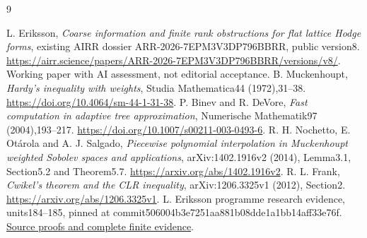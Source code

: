 \documentclass[11pt]{article}
\begin{document}
\begin{thebibliography}{9}\small\raggedright
{} L. Eriksson, \emph{Coarse information and finite rank
obstructions for flat lattice Hodge forms}, existing AIRR dossier
ARR-2026-7EPM3V3DP796BBRR, public version8.
\url{https://airr.science/papers/ARR-2026-7EPM3V3DP796BBRR/versions/v8/}.
Working paper with AI assessment, not editorial acceptance.
 B. Muckenhoupt, \emph{Hardy's inequality with weights},
Studia Mathematica44 (1972),31--38.
\url{https://doi.org/10.4064/sm-44-1-31-38}.
 P. Binev and R. DeVore, \emph{Fast computation in adaptive
tree approximation}, Numerische Mathematik97 (2004),193--217.
\url{https://doi.org/10.1007/s00211-003-0493-6}.
 R. H. Nochetto, E. Ot\'arola and A. J. Salgado,
\emph{Piecewise polynomial interpolation in Muckenhoupt weighted Sobolev
spaces and applications}, arXiv:1402.1916v2 (2014), Lemma3.1,
Section5.2 and Theorem5.7. \url{https://arxiv.org/abs/1402.1916v2}.
 R. L. Frank, \emph{Cwikel's theorem and the CLR inequality},
arXiv:1206.3325v1 (2012), Section2.
\url{https://arxiv.org/abs/1206.3325v1}.
 L. Eriksson programme research evidence, units184--185,
pinned at commit506004b3e7251aa881b08dde1a1bb14aff33e76f.
\href{https://github.com/lluiseriksson/THE-ERIKSSON-PROGRAMME/tree/506004b3e7251aa881b08dde1a1bb14aff33e76f/papers/flat-coarse-rank/research}{Source proofs and complete finite evidence}.
\end{thebibliography}
\end{document}
